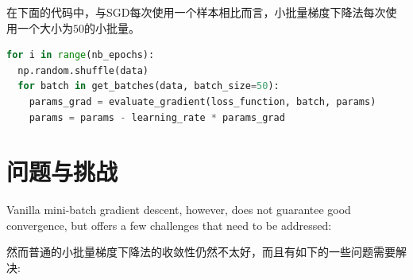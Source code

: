 \documentclass{article}
\begin{document}
在下面的代码中，与SGD每次使用一个样本相比而言，小批量梯度下降法每次使用一个大小为$50$的小批量。

\begin{lstlisting}[language=python]
for i in range(nb_epochs):
  np.random.shuffle(data)
  for batch in get_batches(data, batch_size=50):
    params_grad = evaluate_gradient(loss_function, batch, params)
    params = params - learning_rate * params_grad
\end{lstlisting}

\section{问题与挑战} \label{sec:challenges}

Vanilla mini-batch gradient descent, however, does not guarantee good convergence, but offers a few challenges that need to be addressed:

然而普通的小批量梯度下降法的收敛性仍然不太好，而且有如下的一些问题需要解决:
\end{document}
